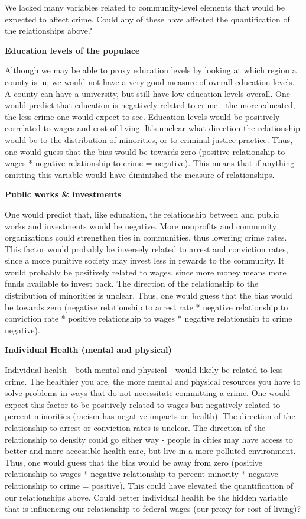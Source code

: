 \documentclass[]{article}
\begin{document}
We lacked many variables related to community-level elements that would
be expected to affect crime. Could any of these have affected the
quantification of the relationships above?

\textbf{Education levels of the populace}

Although we may be able to proxy education levels by looking at which
region a county is in, we would not have a very good measure of overall
education levels. A county can have a university, but still have low
education levels overall. One would predict that education is negatively
related to crime - the more educated, the less crime one would expect to
see. Education levels would be positively correlated to wages and cost
of living. It's unclear what direction the relationship would be to the
distribution of minorities, or to criminal justice practice. Thus, one
would guess that the bias would be towards zero (positive relationship
to wages * negative relationship to crime = negative). This means that
if anything omitting this variable would have diminished the measure of
relationships.

\textbf{Public works \& investments}

One would predict that, like education, the relationship between and
public works and investments would be negative. More nonprofits and
community organizations could strengthen ties in communities, thus
lowering crime rates. This factor would probably be inversely related to
arrest and conviction rates, since a more punitive society may invest
less in rewards to the community. It would probably be positively
related to wages, since more money means more funds available to invest
back. The direction of the relationship to the distribution of
minorities is unclear. Thus, one would guess that the bias would be
towards zero (negative relationship to arrest rate * negative
relationship to conviction rate * positive relationship to wages *
negative relationship to crime = negative).

\textbf{Individual Health (mental and physical)}

Individual health - both mental and physical - would likely be related
to less crime. The healthier you are, the more mental and physical
resources you have to solve problems in ways that do not necessitate
committing a crime. One would expect this factor to be positively
related to wages but negatively related to percent minorities (racism
has negative impacts on health). The direction of the relationship to
arrest or conviction rates is unclear. The direction of the relationship
to density could go either way - people in cities may have access to
better and more accessible health care, but live in a more polluted
environment. Thus, one would guess that the bias would be away from zero
(positive relationship to wages * negative relationship to percent
minority * negative relationship to crime = positive). This could have
elevated the quantification of our relationships above. Could better
individual health be the hidden variable that is influencing our
relationship to federal wages (our proxy for cost of living)?
\end{document}
